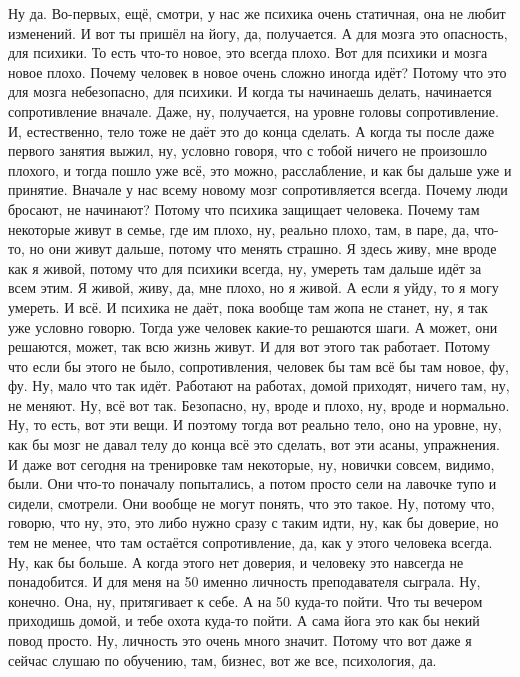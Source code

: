 Ну да. Во-первых, ещё, смотри,
у нас же психика очень статичная, она не любит изменений.
И вот ты пришёл на йогу,
да, получается.
А для мозга это опасность, для психики.
То есть что-то новое, это всегда плохо.
Вот для психики и мозга новое плохо.
Почему человек в новое очень сложно иногда идёт?
Потому что это для мозга небезопасно,
для психики. И когда ты начинаешь делать,
начинается сопротивление вначале.
Даже, ну, получается,
на уровне головы сопротивление.
И, естественно, тело тоже не даёт
это до конца сделать.
А когда ты после даже первого занятия
выжил, ну, условно говоря,
что с тобой ничего не произошло плохого,
и тогда пошло уже всё,
это можно, расслабление,
и как бы дальше уже и принятие.
Вначале у нас всему новому мозг
сопротивляется всегда.
Почему люди бросают, не начинают?
Потому что психика защищает человека.
Почему там некоторые живут
в семье, где им плохо,
ну, реально плохо, там, в паре, да, что-то,
но они живут дальше,
потому что менять страшно.
Я здесь живу, мне вроде как я живой,
потому что для психики всегда, ну,
умереть там дальше идёт за всем этим.
Я живой, живу, да, мне плохо,
но я живой. А если я уйду,
то я могу умереть.
И всё. И психика не даёт, пока
вообще там жопа не станет, ну, я так уже условно говорю.
Тогда уже человек
какие-то решаются шаги. А может, они решаются,
может, так всю жизнь живут.
И для вот этого так работает.
Потому что если бы этого не было, сопротивления,
человек бы там всё бы там новое, фу, фу.
Ну, мало что так идёт.
Работают на работах,
домой приходят,
ничего там, ну, не меняют.
Ну, всё вот так.
Безопасно,
ну, вроде и плохо, ну, вроде и нормально.
Ну, то есть, вот эти вещи.
И поэтому тогда вот реально тело,
оно на уровне, ну, как бы
мозг не давал телу до конца
всё это
сделать, вот эти асаны, упражнения.
И даже вот сегодня
на тренировке там некоторые,
ну, новички совсем, видимо, были.
Они что-то поначалу
попытались, а потом просто сели
на лавочке тупо и сидели, смотрели.
Они вообще не могут понять, что это такое.
Ну, потому что, говорю, что
ну, это, это либо нужно сразу
с таким идти, ну, как бы доверие,
но тем не менее, что там остаётся сопротивление, да,
как у этого человека всегда.
Ну, как бы больше.
А когда этого нет доверия,
и человеку это навсегда не понадобится.
И для меня на 50%
именно личность преподавателя сыграла.
Ну, конечно.
Она, ну, притягивает к себе.
А на 50%
куда-то пойти.
Что ты вечером приходишь домой, и тебе охота куда-то пойти.
А сама йога это как бы
некий повод просто.
Ну, личность это очень много значит.
Потому что вот даже я сейчас слушаю
по обучению, там, бизнес,
вот же все, психология, да.
